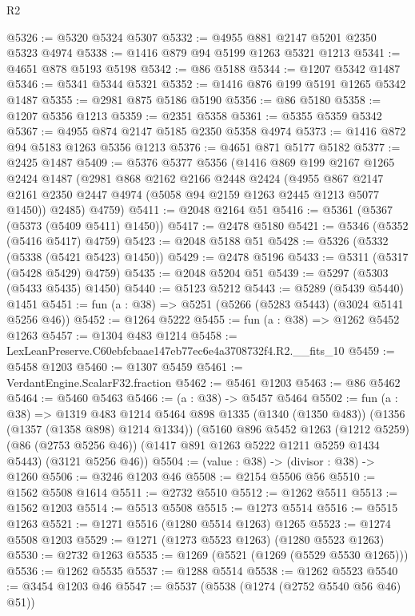 \begin{lexlean}{R2}
\begin{coremodule}
@5326 := @5320 @5324 @5307
@5332 := @4955 @881 @2147 @5201 @2350 @5323 @4974
@5338 := @1416 @879 @94 @5199 @1263 @5321 @1213
@5341 := @4651 @878 @5193 @5198
@5342 := @86 @5188
@5344 := @1207 @5342 @1487
@5346 := @5341 @5344 @5321
@5352 := @1416 @876 @199 @5191 @1265 @5342 @1487
@5355 := @2981 @875 @5186 @5190
@5356 := @86 @5180
@5358 := @1207 @5356 @1213
@5359 := @2351 @5358
@5361 := @5355 @5359 @5342
@5367 := @4955 @874 @2147 @5185 @2350 @5358 @4974
@5373 := @1416 @872 @94 @5183 @1263 @5356 @1213
@5376 := @4651 @871 @5177 @5182
@5377 := @2425 @1487
@5409 := @5376
    @5377
    @5356
    (@1416
      @869
      @199
      @2167
      @1265
      @2424
      @1487
      (@2981
        @868
        @2162
        @2166
        @2448
        @2424
        (@4955 @867 @2147 @2161 @2350 @2447 @4974 (@5058 @94 @2159 @1263 @2445 @1213 @5077 @1450))
        @2485)
      @4759)
@5411 := @2048 @2164 @51
@5416 := @5361 (@5367 (@5373 (@5409 @5411) @1450))
@5417 := @2478 @5180
@5421 := @5346 (@5352 (@5416 @5417) @4759)
@5423 := @2048 @5188 @51
@5428 := @5326 (@5332 (@5338 (@5421 @5423) @1450))
@5429 := @2478 @5196
@5433 := @5311 (@5317 (@5428 @5429) @4759)
@5435 := @2048 @5204 @51
@5439 := @5297 (@5303 (@5433 @5435) @1450)
@5440 := @5123 @5212
@5443 := @5289 (@5439 @5440) @1451
@5451 := fun (a : @38) => @5251 (@5266 (@5283 @5443) (@3024 @5141 @5256 @46))
@5452 := @1264 @5222
@5455 := fun (a : @38) => @1262 @5452 @1263
@5457 := @1304 @483 @1214
@5458 := LexLeanPreserve.C60ebfcbaae147eb77ec6e4a3708732f4.R2.__fits_10
@5459 := @5458 @1203
@5460 := @1307 @5459
@5461 := VerdantEngine.ScalarF32.fraction
@5462 := @5461 @1203
@5463 := @86 @5462
@5464 := @5460 @5463
@5466 := (a : @38) -> @5457 @5464
@5502 := fun (a : @38) =>
  @1319
    @483
    @1214
    @5464
    @898
    @1335
    (@1340 (@1350 @483))
    (@1356 (@1357 (@1358 @898) @1214 @1334))
    (@5160
      @896
      @5452
      @1263
      (@1212 @5259)
      (@86 (@2753 @5256 @46))
      (@1417 @891 @1263 @5222 @1211 @5259 @1434 @5443)
      (@3121 @5256 @46))
@5504 := (value : @38) -> (divisor : @38) -> @1260
@5506 := @3246 @1203 @46
@5508 := @2154 @5506 @56
@5510 := @1562 @5508 @1614
@5511 := @2732 @5510
@5512 := @1262 @5511
@5513 := @1562 @1203
@5514 := @5513 @5508
@5515 := @1273 @5514
@5516 := @5515 @1263
@5521 := @1271 @5516 (@1280 @5514 @1263) @1265
@5523 := @1274 @5508 @1203
@5529 := @1271 (@1273 @5523 @1263) (@1280 @5523 @1263)
@5530 := @2732 @1263
@5535 := @1269 (@5521 (@1269 (@5529 @5530 @1265)))
@5536 := @1262 @5535
@5537 := @1288 @5514
@5538 := @1262 @5523
@5540 := @3454 @1203 @46
@5547 := @5537 (@5538 (@1274 (@2752 @5540 @56 @46) @51))

\end{coremodule}
\end{lexlean}
